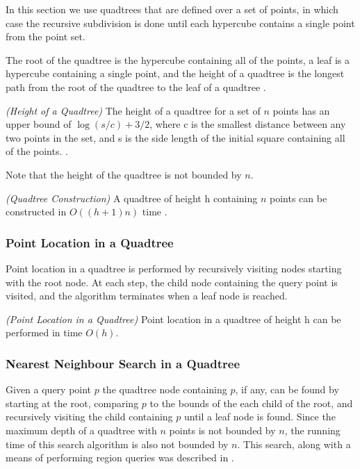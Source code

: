 \documentclass[mcs]{scsthesis}
\begin{document}
In this section we use quadtrees that are defined over a set of points, in which
case the recursive subdivision is done until each hypercube contains a single
point from the point set.

The root of the quadtree is the hypercube containing all of the points, a leaf
is a hypercube containing a single point, and the height of a quadtree
is the longest path from the root of the quadtree to the leaf of a quadtree
\cite{dutch}.

\begin{thm} \emph{(Height of a Quadtree)}
The height of a quadtree for a set of $n$ points has an upper bound of \(\log(s/c)
+ 3/2\), where c is the smallest distance between any two points in the set, and
s is the side length of the initial square containing all of the points.
\cite{dutch}.
\end{thm}

Note that the height of the quadtree is not bounded by $n$.

\begin{thm} \emph{(Quadtree Construction)}
A quadtree of height h containing $n$ points can be constructed in \(O((h + 1)n)\)
time \cite{dutch}.
\end{thm}

\subsubsection{Point Location in a Quadtree}

Point location in a quadtree is performed by recursively visiting nodes
starting with the root node. At each step, the child node containing the query
point is visited, and the algorithm terminates when a leaf node is reached.

\begin{thm} \emph{(Point Location in a Quadtree)} 
Point location in a quadtree of height h can be performed in time \(O(h)\). 
\end{thm}

\subsubsection{Nearest Neighbour Search in a Quadtree}

Given a query point $p$ the quadtree node containing $p$, if any, can be found by
starting at the root, comparing $p$ to the bounds of the each child of the root,
and recursively visiting the child containing $p$ until a leaf node is found.  
Since the maximum depth of a quadtree with $n$ points is not bounded by $n$, the
running time of this search algorithm is also not bounded by $n$. This search,
along with a means of performing region queries was described in
\cite{quadtree}.
\end{document}
